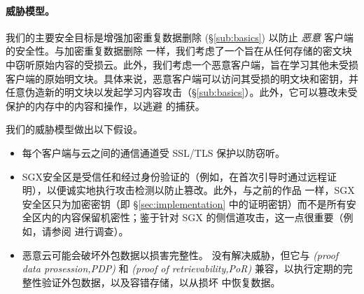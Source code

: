 \paragraph{威胁模型。} 我们的主要安全目标是增强加密重复数据删除 (\S\ref{sub:basics}) 以防止 {\em 恶意} 客户端的安全性。与加密重复数据删除 \cite{bellare13a} 一样，我们考虑了一个旨在从任何存储的密文块中窃听原始内容的受损云。此外，我们考虑一个恶意客户端，旨在学习其他未受损客户端的原始明文块。具体来说，恶意客户端可以访问其受损的明文块和密钥，并任意伪造新的明文块以发起学习内容攻击（\S\ref{sub:basics}）。此外，它可以篡改未受保护的内存中的内容和操作，以逃避 \sysnameF 的捕获。

我们的威胁模型做出以下假设。
\begin{itemize}[leftmargin=*]
\item
  每个客户端与云之间的通信通道受 SSL/TLS 保护以防窃听。
\item
  SGX安全区是受信任和经过身份验证的（例如，在首次引导时通过远程证明），以便诚实地执行攻击检测以防止篡改。此外，与之前的作品 \cite{shinde20, ren21} 一样，SGX安全区只为加密密钥（即 \S\ref{sec:implementation} 中的证明密钥）而不是所有安全区内的内容保留机密性；鉴于针对 SGX 的侧信道攻击，这一点很重要（例如，请参阅 \cite{fei21} 进行调查）。
\item
  恶意云可能会破坏外包数据以损害完整性。 \sysnameF 没有解决威胁，但它与 \textit{  (proof data prosession,PDP)} \cite{ateniese07} 和 \textit{  (proof of retrievability,PoR)} \cite{juels07} 兼容，以执行定期的完整性验证外包数据，以及容错存储，以从损坏 \cite{li15} 中恢复数据。
\end{itemize}
